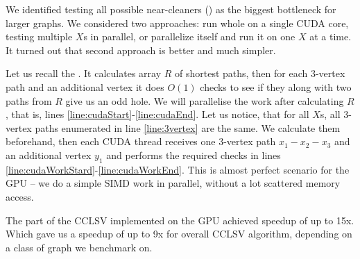 


We identified testing all possible near-cleaners () as the biggest bottleneck for larger graphs. We considered two approaches: run whole  on a single CUDA core, testing multiple $X$s in parallel, or parallelize  itself and run it on one $X$ at a time. It turned out that second approach is better and much simpler.

Let us recall the . It calculates array $R$ of shortest paths, then for each 3-vertex path and an additional vertex it does $O(1)$ checks to see if they along with two paths from $R$ give us an odd hole. We will parallelise the work after calculating $R$, that is, lines \ref{line:cudaStart}-\ref{line:cudaEnd}. Let us notice, that for all $X$s, all 3-vertex paths enumerated in line \ref{line:3vertex} are the same. We calculate them beforehand, then each CUDA thread receives one 3-vertex path $x_1 - x_2 - x_3$ and an additional vertex $y_1$ and performs the required checks in lines \ref{line:cudaWorkStard}-\ref{line:cudaWorkEnd}. This is almost perfect scenario for the GPU -- we do a simple SIMD work in parallel, without a lot scattered memory access.

The part of the CCLSV implemented on the GPU achieved speedup of up to 15x. Which gave us a speedup of up to 9x for overall CCLSV algorithm, depending on a class of graph we benchmark on.

